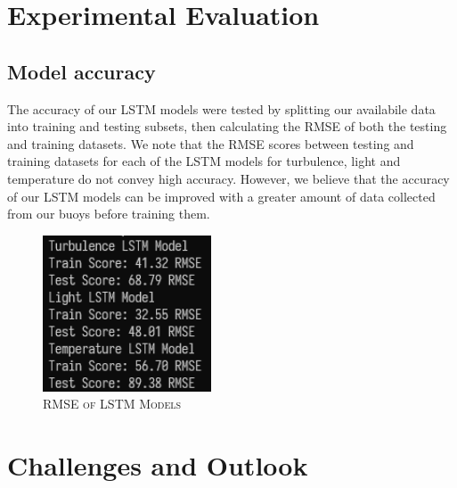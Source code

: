 \documentclass{article}
\begin{document}
\section{Experimental Evaluation}

\subsection{Model accuracy}

\begin{multicols}{2}
    
The accuracy of our LSTM models were tested by splitting our availabile data into training and testing subsets, then calculating the RMSE of both the testing and training datasets. We note that the RMSE scores between testing and training datasets for each of the LSTM models for turbulence, light and temperature do not convey high accuracy. However, we believe that the accuracy of our LSTM models can be improved with a greater amount of data collected from our buoys before training them.

\end{multicols}
\begin{figure}[H]
    \centering
    \includegraphics[width=5cm]{report/images/rmse.png}\\
    \textsc{RMSE of LSTM Models}
    \label{fig:my_label}
\end{figure}


\newpage
\section{Challenges and Outlook}
\end{document}
